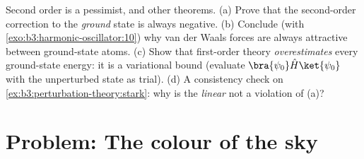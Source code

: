 \begin{exercise}[$\star\star\star$]\label{exo:b3:perturbation-theory:12}
Second order is a pessimist, and other theorems. (a) Prove that
the second-order correction to the \emph{ground} state is always
negative. (b) Conclude (with
\cref{exo:b3:harmonic-oscillator:10}) why van der Waals forces are
always attractive between ground-state atoms. (c) Show that
first-order theory \emph{overestimates} every ground-state
energy: it is a variational bound (evaluate $\bra{\psi_0}\hat
H\ket{\psi_0}$ with the unperturbed state as trial). (d) A
consistency check on \cref{ex:b3:perturbation-theory:stark}: why
is the \emph{linear}  not a violation of (a)?
\end{exercise}

\section{Problem: The colour of the sky}

